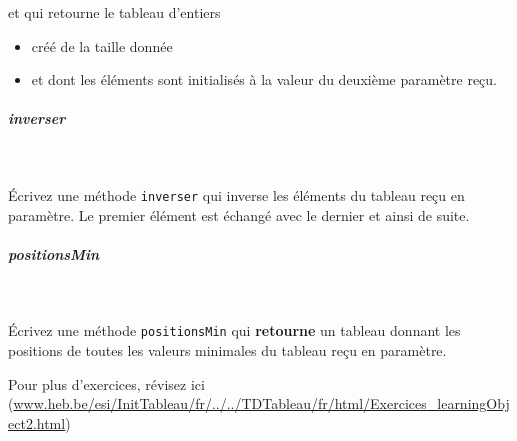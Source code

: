 \documentclass[11pt,a4paper]{article}
\begin{document}
					et qui retourne le tableau d'entiers
					
					\begin{itemize}
				
			\item cr\'e\'e de la taille donn\'ee
			\item et dont les \'el\'ements sont initialis\'es \`a la valeur du deuxi\`eme param\`etre re\c cu.
					\end{itemize}
				
            \par
        
			
		\subparagraph{inverser} 
		
					\textcolor{white}{.} \par
				
            \par
        
					\'Ecrivez une m\'ethode 
					\verb|inverser| 
					qui inverse les \'el\'ements du tableau re\c cu en param\`etre.
					Le premier \'el\'ement est \'echang\'e avec le dernier 
					et ainsi de suite.
				
            \par
        
			
		\subparagraph{positionsMin} 
		
					\textcolor{white}{.} \par
				
            \par
        
					\'Ecrivez une m\'ethode
					\verb|positionsMin|
					qui 
					\textbf{retourne}
					un tableau donnant les positions
					de toutes les valeurs minimales
					du tableau re\c cu en param\`etre.
				
            \par
        Pour plus d'exercices, 
          r\'evisez ici (\url{www.heb.be/esi/InitTableau/fr/../../TDTableau/fr/html/Exercices\_learningObject2.html})
            \par
        
				
\end{document}
